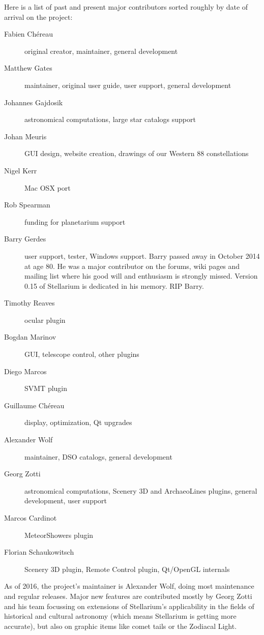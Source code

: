 Here is a list of past and present major contributors sorted roughly by date of
arrival on the project:
\begin{description}
\item[Fabien Ch\'ereau] original creator, maintainer, general development
\item[Matthew Gates] maintainer, original user guide, user support, general development
\item[Johannes Gajdosik] astronomical computations, large star catalogs support
\item[Johan Meuris] GUI design, website creation, drawings of our Western 88 constellations
\item[Nigel Kerr] Mac OSX port
\item[Rob Spearman] funding for planetarium support
\item[Barry Gerdes] user support, tester, Windows support. Barry
  passed away in October 2014 at age 80. He was a major contributor on
  the forums, wiki pages and mailing list where his good will and
  enthusiasm is strongly missed. Version 0.15 of Stellarium is
  dedicated in his memory. RIP Barry.
\item[Timothy Reaves] ocular plugin
\item[Bogdan Marinov] GUI, telescope control, other plugins
\item[Diego Marcos] SVMT plugin
\item[Guillaume Ch\'ereau] display, optimization, Qt upgrades
\item[Alexander Wolf] maintainer, DSO catalogs, general development
\item[Georg Zotti] astronomical computations, Scenery 3D and ArchaeoLines plugins, general development, user support
\item[Marcos Cardinot] MeteorShowers plugin
\item[Florian Schaukowitsch] Scenery 3D plugin, Remote Control plugin, Qt/OpenGL internals
\end{description}

As of 2016, the project's maintainer is Alexander Wolf, doing most maintenance
and regular releases. Major new features are contributed mostly by Georg Zotti
and his team focussing on extensions of Stellarium's applicability in the fields of
historical and cultural astronomy (which means Stellarium is getting more
accurate), but also on graphic items like comet tails or the Zodiacal Light.

